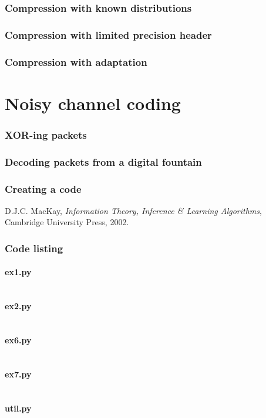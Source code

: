 \documentclass[10pt,a4paper,twoside,twocolumn]{article}
\begin{document}
\section{Compression with known distributions}\label{sec:ex3}
\section{Compression with limited precision header}\label{sec:ex4}
\section{Compression with adaptation}\label{sec:ex5}


\part{Noisy channel coding}

\section{XOR-ing packets}\label{sec:ex6}
\section{Decoding packets from a digital fountain}\label{sec:ex7}
\section{Creating a code}\label{sec:ex8}


\begin{thebibliography}{9}

    D.J.C. MacKay,
    \emph{Information Theory, Inference \& Learning Algorithms},
    Cambridge University Press,
    2002.

\end{thebibliography}


\onecolumn
\appendixpage
\appendix

\section{Code listing}

\subsection{ex1.py}\label{app:ex1}
\inputminted{python}{../src/ex1.py}

\subsection{ex2.py}\label{app:ex2}
\inputminted{python}{../src/ex2.py}

\subsection{ex6.py}\label{app:ex6}
\inputminted{python}{../src/ex6.py}

\subsection{ex7.py}\label{app:ex7}
\inputminted{python}{../src/ex7.py}

\subsection{util.py}\label{app:util}
\inputminted{python}{../src/util.py}
\end{document}
